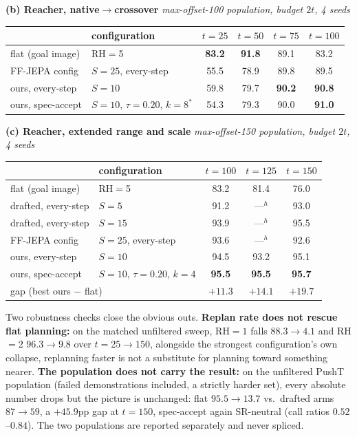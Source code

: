 \documentclass{article}
\newcommand{\ours}[1]{\textbf{#1}}
\begin{document}
\begin{table}[h]
\vspace{8pt}
\textbf{(b) Reacher, native$\to$crossover} \quad \emph{max-offset-100 population,
budget $2t$, 4 seeds}

\vspace{2pt}
\begin{tabular}{llcccc}
\toprule
& configuration & $t{=}25$ & $t{=}50$ & $t{=}75$ & $t{=}100$ \\
\midrule
flat (goal image)   & RH$=$5                             & \ours{83.2} & \ours{91.8} & 89.1 & 83.2 \\
FF-JEPA config      & $S{=}25$, every-step               & 55.5 & 78.9 & 89.8 & 89.5 \\
ours, every-step    & $S{=}10$                           & 59.8 & 79.7 & \ours{90.2} & \ours{90.8} \\
ours, spec-accept   & $S{=}10$, $\tau{=}0.20$, $k{=}8^{\ast}$ & 54.3 & 79.3 & 90.0 & \ours{91.0} \\
\bottomrule
\end{tabular}

\vspace{8pt}
\textbf{(c) Reacher, extended range and scale} \quad \emph{max-offset-150
population, budget $2t$, 4 seeds}

\vspace{2pt}
\begin{tabular}{llccc}
\toprule
& configuration & $t{=}100$ & $t{=}125$ & $t{=}150$ \\
\midrule
flat (goal image)   & RH$=$5                             & 83.2 & 81.4 & 76.0 \\
drafted, every-step & $S{=}5$                            & 91.2 & ---$^{h}$ & 93.0 \\
drafted, every-step & $S{=}15$                           & 93.9 & ---$^{h}$ & 95.5 \\
FF-JEPA config      & $S{=}25$, every-step               & 93.6 & ---$^{h}$ & 92.6 \\
ours, every-step    & $S{=}10$                           & 94.5 & 93.2 & 95.1 \\
ours, spec-accept   & $S{=}10$, $\tau{=}0.20$, $k{=}4$    & \ours{95.5} & \ours{95.5} & \ours{95.7} \\
\midrule
\multicolumn{2}{l}{gap (best ours $-$ flat)} & $+11.3$ & $+14.1$ & $+19.7$ \\
\bottomrule
\end{tabular}
\end{table}

Two robustness checks close the obvious outs. \textbf{Replan rate does not rescue
flat planning:} on the matched unfiltered sweep, RH${=}1$ falls $88.3\to4.1$ and
RH${=}2$ $96.3\to9.8$ over $t{=}25\to150$, alongside the strongest configuration's
own collapse, replanning faster is not a substitute for planning toward something
nearer. \textbf{The population does not carry the result:} on the unfiltered PushT
population (failed demonstrations included, a strictly harder set), every absolute
number drops but the picture is unchanged: flat $95.5\to13.7$ vs.\ drafted arms
$87\to59$, a $+45.9$pp gap at $t{=}150$, spec-accept again SR-neutral (call ratios
$0.52$--$0.84$). The two populations are reported separately and never spliced.
\end{document}

